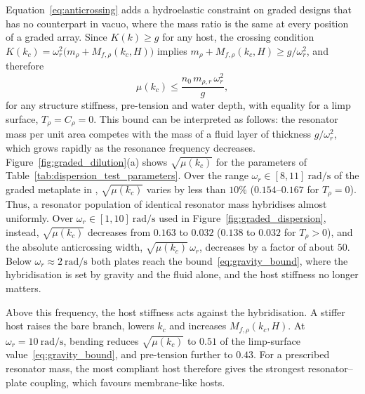 {\color{red} %
Equation~\eqref{eq:anticrossing} adds a hydroelastic constraint on graded designs that has no counterpart in vacuo, where the mass ratio is the same at every position of a graded array. Since $K(k)\ge g$ for any host, the crossing condition $K(k_c)=\omega_r^2\big(m_\rho+M_{f,\rho}(k_c,H)\big)$ implies $m_\rho+M_{f,\rho}(k_c,H)\ge g/\omega_r^2$, and therefore
\begin{equation}\label{eq:gravity_bound}
    \mu(k_c)\le\frac{n_0\,m_{\rho,r}\,\omega_r^2}{g},
\end{equation}
for any structure stiffness, pre-tension and water depth, with equality for a limp surface, $T_\rho=C_\rho=0$. This bound can be interpreted as follows: the resonator mass per unit area competes with the mass of a fluid layer of thickness $g/\omega_r^2$, which grows rapidly as the resonance frequency decreases. Figure~\ref{fig:graded_dilution}(a) shows $\sqrt{\mu(k_c)}$ for the parameters of Table~\ref{tab:dispersion_test_parameters}. Over the range $\omega_r\in[8,11]~\si{\radian\per\second}$ of the graded metaplate in \cite{liu2025metaplate}, $\sqrt{\mu(k_c)}$ varies by less than $10\%$ ($0.154$--$0.167$ for $T_\rho=0$). Thus, a resonator population of identical resonator mass hybridises almost uniformly. Over $\omega_r\in[1,10]~\si{\radian\per\second}$ used in Figure~\ref{fig:graded_dispersion}, instead, $\sqrt{\mu(k_c)}$ decreases from $0.163$ to $0.032$ ($0.138$ to $0.032$ for $T_\rho>0$), and the absolute anticrossing width, $\sqrt{\mu(k_c)}\,\omega_r$, decreases by a factor of about $50$. Below $\omega_r\approx2~\si{\radian\per\second}$ both plates reach the bound~\eqref{eq:gravity_bound}, where the hybridisation is set by gravity and the fluid alone, and the host stiffness no longer matters.

Above this frequency, the host stiffness acts against the hybridisation. A stiffer host raises the bare branch, lowers $k_c$ and increases $M_{f,\rho}(k_c,H)$. At $\omega_r=10~\si{\radian\per\second}$, bending reduces $\sqrt{\mu(k_c)}$ to $0.51$ of the limp-surface value~\eqref{eq:gravity_bound}, and pre-tension further to $0.43$. For a prescribed resonator mass, the most compliant host therefore gives the strongest resonator--plate coupling, which favours membrane-like hosts.

}

